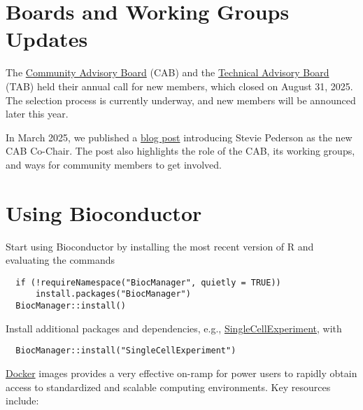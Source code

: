 \section{Boards and Working Groups Updates}\label{boards-and-working-groups-updates}

The \href{https://bioconductor.org/about/community-advisory-board/}{Community Advisory Board} (CAB) and the \href{https://bioconductor.org/about/technical-advisory-board/}{Technical Advisory Board} (TAB) held their annual call for new members, which closed on August 31, 2025. The selection process is currently underway, and new members will be announced later this year.

In March 2025, we published a \href{https://blog.bioconductor.org/posts/2025-03-05-CAB/}{blog post} introducing Stevie Pederson as the new CAB Co-Chair. The post also highlights the role of the CAB, its working groups, and ways for community members to get involved.

\section{Using Bioconductor}\label{using-bioconductor}

Start using
Bioconductor by installing the most recent version of R and evaluating
the commands

\begin{verbatim}
  if (!requireNamespace("BiocManager", quietly = TRUE))
      install.packages("BiocManager")
  BiocManager::install()
\end{verbatim}

Install additional packages and dependencies,
e.g., \href{https://bioconductor.org/packages/SingleCellExperiment}{SingleCellExperiment}, with

\begin{verbatim}
  BiocManager::install("SingleCellExperiment")
\end{verbatim}

\href{https://bioconductor.org/help/docker/}{Docker}
images provides a very effective on-ramp for power users to rapidly
obtain access to standardized and scalable computing environments.
Key resources include:

